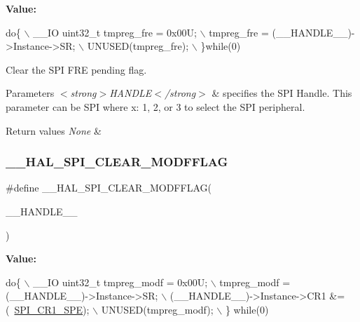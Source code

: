 {\bfseries Value\+:}
\begin{DoxyCode}
\textcolor{keywordflow}{do}\{                                              \(\backslash\)
  \_\_IO uint32\_t tmpreg\_fre = 0x00U;                \(\backslash\)
  tmpreg\_fre = (\_\_HANDLE\_\_)->Instance->SR;         \(\backslash\)
  UNUSED(tmpreg\_fre);                              \(\backslash\)
  \}\textcolor{keywordflow}{while}(0)
\end{DoxyCode}


Clear the S\+PI F\+RE pending flag. 


\begin{DoxyParams}{Parameters}
{\em $<$strong$>$\+H\+A\+N\+D\+L\+E$<$/strong$>$} & specifies the S\+PI Handle. This parameter can be S\+PI where x\+: 1, 2, or 3 to select the S\+PI peripheral. \\
\hline
\end{DoxyParams}

\begin{DoxyRetVals}{Return values}
{\em None} & \\
\hline
\end{DoxyRetVals}
\mbox{\label{group___s_p_i___exported___macros_ga6c88becbe528c542156bc201622efba2}} 
\subsubsection{\texorpdfstring{\+\_\+\+\_\+\+H\+A\+L\+\_\+\+S\+P\+I\+\_\+\+C\+L\+E\+A\+R\+\_\+\+M\+O\+D\+F\+F\+L\+AG}{\_\_HAL\_SPI\_CLEAR\_MODFFLAG}}
{\footnotesize\ttfamily \#define \+\_\+\+\_\+\+H\+A\+L\+\_\+\+S\+P\+I\+\_\+\+C\+L\+E\+A\+R\+\_\+\+M\+O\+D\+F\+F\+L\+AG(\begin{DoxyParamCaption}\item[{}]{\+\_\+\+\_\+\+H\+A\+N\+D\+L\+E\+\_\+\+\_\+ }\end{DoxyParamCaption})}

{\bfseries Value\+:}
\begin{DoxyCode}
\textcolor{keywordflow}{do}\{                                              \(\backslash\)
    \_\_IO uint32\_t tmpreg\_modf = 0x00U;             \(\backslash\)
    tmpreg\_modf = (\_\_HANDLE\_\_)->Instance->SR;      \(\backslash\)
    (\_\_HANDLE\_\_)->Instance->CR1 &= (~\hyperlink{group___peripheral___registers___bits___definition_gac5a646d978d3b98eb7c6a5d95d75c3f9}{SPI\_CR1\_SPE}); \(\backslash\)
    UNUSED(tmpreg\_modf);                           \(\backslash\)
  \} \textcolor{keywordflow}{while}(0)
\end{DoxyCode}


